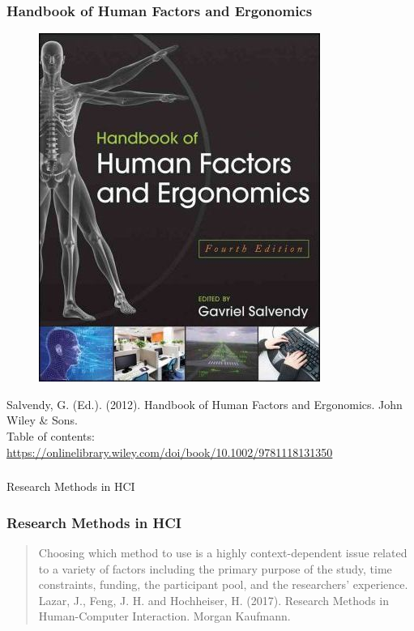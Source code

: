 \documentclass[screen, aspectratio=169]{beamer}
\begin{document}
\begin{frame}
\frametitle{Handbook of Human Factors and Ergonomics}
 \begin{figure}
	\includegraphics[scale=0.3]{img/Salvendy-Handbook-Human-Factors-Ergonomics.jpg}
    \end{figure}
    Salvendy, G. (Ed.). (2012). Handbook of Human Factors and Ergonomics. John Wiley \& Sons. \cite{Salvendy.2012.handbook}\\
    Table of contents: \url{https://onlinelibrary.wiley.com/doi/book/10.1002/9781118131350}
\end{frame}
%
\begin{frame}
\frametitle{}
\Huge{Research Methods in HCI}
\end{frame}
%
\begin{frame}
\frametitle{Research Methods in HCI}
\begin{quote}
Choosing which method to use is a highly context-dependent issue related to a variety of factors including the primary purpose of the study, time constraints, funding, the participant pool, and the researchers' experience. \cite[p.25]{Lazar.et.al.2017.research}
\vspace{5mm}
Lazar, J., Feng, J. H. and Hochheiser, H. (2017). Research Methods in Human-Computer Interaction. Morgan Kaufmann. 
\end{quote}
\end{frame}
%
\end{document}
